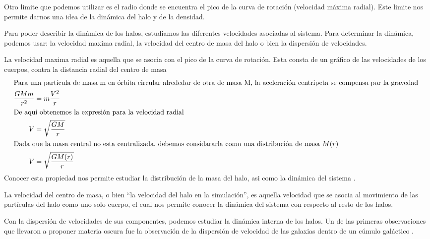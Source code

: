 Otro limite que podemos utilizar es el radio donde se encuentra el pico de la curva de rotación (velocidad máxima radial). Este limite nos permite darnos una idea de la dinámica del halo y de la densidad.

Para poder describir la dinámica de los halos, estudiamos las diferentes velocidades asociadas al sistema. Para determinar la dinámica, podemos usar: la velocidad maxima radial, la velocidad del centro de masa del halo o bien la dispersión de velocidades.

La velocidad maxima radial es aquella que se asocia con el pico de la curva de rotación. Esta consta de un gráfico de las velocidades de los cuerpos, contra la distancia radial del centro de masa 
\begin{align}
    \intertext{Para una partícula de masa m en órbita circular alrededor de otra de masa M, la aceleración centripeta se compensa por la gravedad }
    \frac{ G M m}{r^2} &= m \frac{ V^2 }{ r } \nonumber \\
    \intertext{De aqui obtenemos la expresión para la velocidad radial}
    V &= \sqrt{\frac{ G M }{ r } } \nonumber \\
    \intertext{Dada que la masa central no esta centralizada, debemos considararla como una distribución de masa $M(r)$}
    V &= \sqrt{\frac{ G M(r) }{ r } }
\end{align}
Conocer esta propiedad nos permite estudiar la distribución de la masa del halo, asi como la dinámica del sistema \cite{2001BookScienceCosmo}.

La velocidad del centro de masa, o bien ``la velocidad del halo en la simulación'', es aquella velocidad que se asocia al movimiento de las partículas del halo como uno solo cuerpo, el cual nos permite conocer la dinámica del sistema con respecto al resto de los halos.

Con la dispersión de velocidades de sus componentes, podemos estudiar la dinámica interna de los halos. Un de las primeras observaciones que llevaron a proponer materia oscura fue la observación de la dispersión de velocidad  de las galaxias dentro de un cúmulo galáctico \cite{1937ApJ....86..217Z}. 




